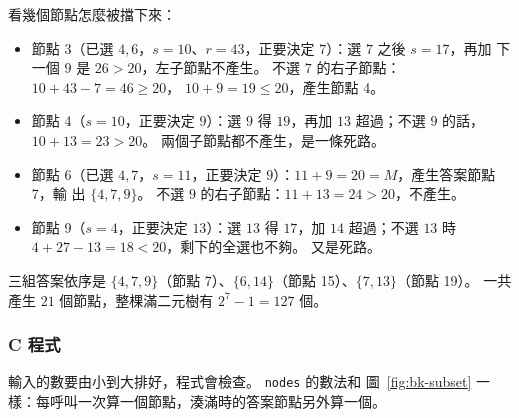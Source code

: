 看幾個節點怎麼被擋下來：

\begin{itemize}
\item 節點 3（已選 $4, 6$，$s = 10$、$r = 43$，正要決定 $7$）：選 $7$ 之後 $s = 17$，再加
下一個 $9$ 是 $26 > 20$，左子節點不產生。 不選 $7$ 的右子節點：$10 + 43 - 7 = 46 \ge 20$，
$10 + 9 = 19 \le 20$，產生節點 4。
\item 節點 4（$s = 10$，正要決定 $9$）：選 $9$ 得 $19$，再加 $13$ 超過；不選 $9$ 的話，$10 +
13 = 23 > 20$。 兩個子節點都不產生，是一條死路。
\item 節點 6（已選 $4, 7$，$s = 11$，正要決定 $9$）：$11 + 9 = 20 = M$，產生答案節點 7，輸
出 $\{4, 7, 9\}$。 不選 $9$ 的右子節點：$11 + 13 = 24 > 20$，不產生。
\item 節點 9（$s = 4$，正要決定 $13$）：選 $13$ 得 $17$，加 $14$ 超過；不選 $13$ 時 $4 + 27 -
13 = 18 < 20$，剩下的全選也不夠。 又是死路。
\end{itemize}

三組答案依序是 $\{4, 7, 9\}$（節點 7）、$\{6, 14\}$（節點 15）、$\{7, 13\}$（節點 19）。 一共
產生 $21$ 個節點，整棵滿二元樹有 $2^7 - 1 = 127$ 個。

\subsubsection{C 程式}

輸入的數要由小到大排好，程式會檢查。 \texttt{nodes} 的數法和
圖~\ref{fig:bk-subset} 一樣：每呼叫一次算一個節點，湊滿時的答案節點另外算一個。

